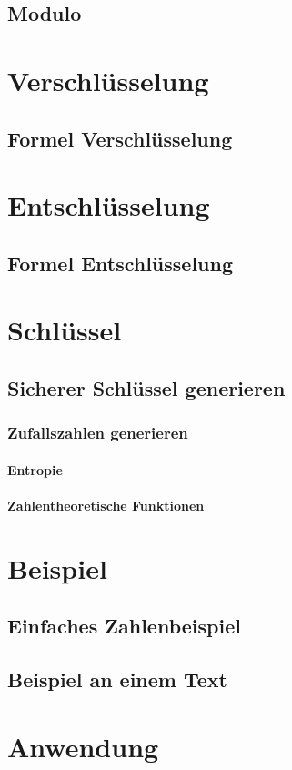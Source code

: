 \documentclass[12pt,a4paper,german]{article}
\begin{document}
\subsection{Modulo}
\section{Verschlüsselung}
\subsection{Formel Verschlüsselung}
\section{Entschlüsselung}
\subsection{Formel Entschlüsselung}
\section{Schlüssel}
\subsection{Sicherer Schlüssel generieren}
\subsubsection{Zufallszahlen generieren}
\paragraph{Entropie}
\paragraph{Zahlentheoretische Funktionen}
\section{Beispiel}
\subsection{Einfaches Zahlenbeispiel}
\subsection{Beispiel an einem Text}
\section{Anwendung}
\end{document}
